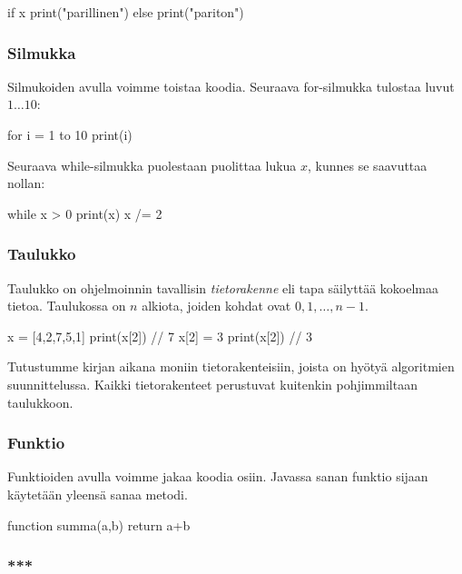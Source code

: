 \begin{code}
if x%
    print("parillinen")
else
    print("pariton")
\end{code}

\subsubsection{Silmukka}

Silmukoiden avulla voimme toistaa koodia.
Seuraava for-silmukka tulostaa luvut $1 \dots 10$:

\begin{code}
for i = 1 to 10
    print(i)
\end{code}

Seuraava while-silmukka puolestaan puolittaa lukua $x$,
kunnes se saavuttaa nollan:

\begin{code}
while x > 0
    print(x)
    x /= 2
\end{code}

\subsubsection{Taulukko}

Taulukko on ohjelmoinnin tavallisin \emph{tietorakenne}
eli tapa säilyttää kokoelmaa tietoa.
Taulukossa on $n$ alkiota, joiden kohdat ovat $0,1,\dots,n-1$.

\begin{code}
x = [4,2,7,5,1]
print(x[2]) // 7
x[2] = 3
print(x[2]) // 3
\end{code}

Tutustumme kirjan aikana moniin tietorakenteisiin,
joista on hyötyä algoritmien suunnittelussa.
Kaikki tietorakenteet perustuvat kuitenkin pohjimmiltaan taulukkoon.

\subsubsection{Funktio}

Funktioiden avulla voimme jakaa koodia osiin.
Javassa sanan funktio sijaan käytetään yleensä sanaa metodi.

\begin{code}
function summa(a,b)
    return a+b
\end{code}

\subsubsection{***}

